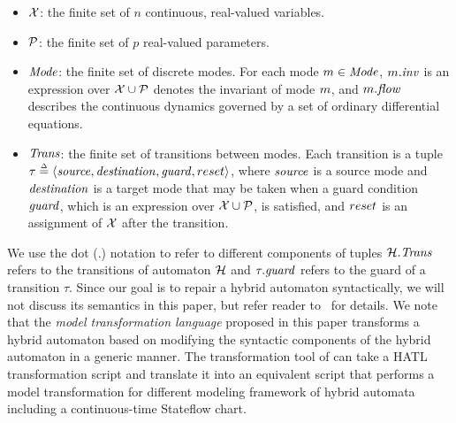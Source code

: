 %
\begin{itemize}[leftmargin= 2em]
%
\item $\X$: the finite set of $n$ continuous, real-valued variables. 
\item $\P$: the finite set of $p$ real-valued parameters.
\item $\Locset$: the finite set of discrete modes. For each mode $\mode \in \Locset$, $\mode.\inveg$ is an expression over $\X \cup \P$ denotes the invariant of mode $\mode$, and $\mode.\floweg$ describes the continuous dynamics governed by a set of ordinary differential equations. %
\item $\Transset$: the finite set of transitions between modes. Each transition is a tuple $\tau \deq \tuple{\src, \dst, \guard, \reset}$, where $\src$ is a source mode and $\dst$ is a target mode that may be taken when a guard condition $\guard$, which is an expression over $\X \cup \P$, is satisfied, and $\reset$ is an assignment of $\X$ after the transition. 
%
%
\end{itemize}
%
We use the dot (.) notation to refer to different components of tuples \eg $\AutomatonH.\Transset$ refers to the transitions of automaton $\AutomatonH$ and $\tau.\guard$ refers to the guard of a transition $\tau$. Since our goal is to repair a hybrid automaton syntactically, we will not discuss its semantics in this paper, but refer reader to~\cite{alur1995algorithmic} for details. 
%
We note that the \emph{model transformation language} proposed in this paper transforms a hybrid automaton based on modifying the syntactic components of the hybrid automaton in a generic manner. 
%
The transformation tool of \toolreaffirm can take a HATL transformation script and translate it into an equivalent script that performs a model transformation for different modeling framework of hybrid automata including a continuous-time Stateflow chart.
%

